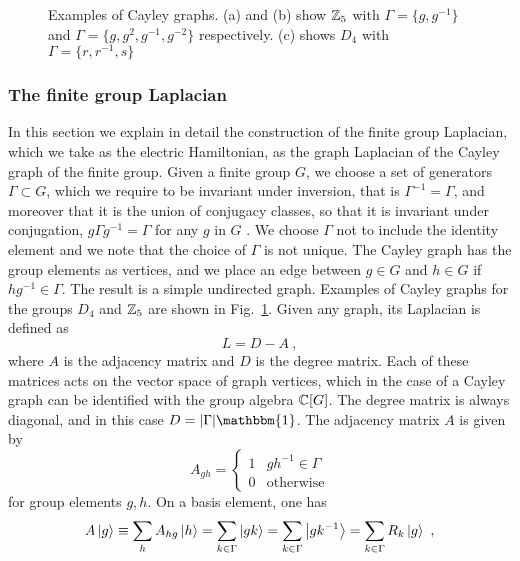 \begin{figure}[t]
    \centering
    
    \caption{%
        Examples of Cayley graphs.
        (a) and (b) show $\mathbb{Z}_5$ with $\Gamma = \{g,g^{-1}\}$ and $\Gamma = \{g,g^2, g^{-1}, g^{-2}\}$ respectively.
        (c) shows $D_4$ with $\Gamma = \{r,r^{-1}, s\}$
    }
    \label{fig:examples of Cayley graphs}
\end{figure}



\subsubsection{The finite group Laplacian}\label{sec:finitegrouplaplacian}
In this section we explain in detail the construction of the finite group Laplacian, which we take as the electric Hamiltonian, as the graph Laplacian of the Cayley graph of the finite group.
Given a finite group $G$, we choose a set of generators $\Gamma \subset G$, which we require to be invariant under inversion, that is $\Gamma^{-1}=\Gamma$, and moreover that it is the union of conjugacy classes, so that it is invariant under conjugation, $g \Gamma g^{-1}=\Gamma$ for any $g$ in $G$ \cite{spectralgraphtheory}.
We choose $\Gamma$ not to include the identity element and we note that the choice of $\Gamma$ is not unique.
The Cayley graph has the group elements as vertices, and we place an edge between $g \in G$ and $h \in G$ if $h g^{-1} \in \Gamma$.
The result is a simple undirected graph.
Examples of Cayley graphs for the groups $D_4$ and $\mathbb{Z}_5$ are shown in Fig.~\ref{fig:examples of Cayley graphs}.
Given any graph, its Laplacian is defined as \cite{spectralgraphtheory}
\begin{equation}
    L = D-A \ ,
\end{equation}
where $A$ is the adjacency matrix and $D$ is the degree matrix.
Each of these matrices acts on the vector space of graph vertices, which in the case of a Cayley graph can be identified with the group algebra $\mathbb{C}[G]$.
The degree matrix is always diagonal, and in this case $D=\abs{\Gamma} \mathbbm{1}$.
The adjacency matrix $A$ is given by
\begin{equation}
    A_{gh} = \begin{cases}1 & g h^{-1} \in \Gamma\\ 0 & \mathrm{otherwise}\end{cases}
\end{equation}
for group elements $g,h$.
On a basis element, one has
\begin{equation}
    A \ket{g} \equiv \sum_h A_{hg} \ket{h} = \sum_{k \in \Gamma} \ket{gk} = \sum_{k \in \Gamma} \ket{gk^{-1}} = \sum_{k \in \Gamma} R_k \ket{g} \ ,
\end{equation}
